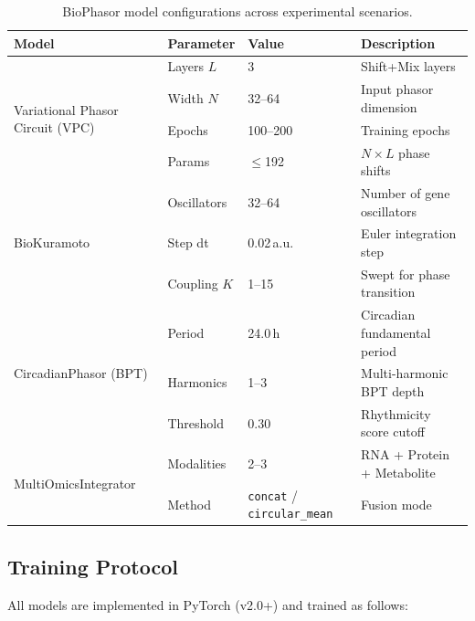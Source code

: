 \documentclass[preprint,12pt,amsmath,amssymb,superscriptaddress,floatfix]{revtex4-2}
\begin{document}
\begin{table}[h]
\centering
\caption{BioPhasor model configurations across experimental scenarios.}
\label{tab:hyperparams}
\begin{tabular}{llll}
\toprule
\textbf{Model} & \textbf{Parameter} & \textbf{Value} & \textbf{Description}\\
\midrule
\multirow{4}{*}{Variational Phasor Circuit (VPC)}
  & Layers $L$  & 3         & Shift+Mix layers \\
  & Width $N$   & 32--64    & Input phasor dimension \\
  & Epochs      & 100--200  & Training epochs \\
  & Params      & $\leq$192 & $N \times L$ phase shifts \\
\midrule
\multirow{3}{*}{BioKuramoto}
  & Oscillators & 32--64    & Number of gene oscillators \\
  & Step dt     & 0.02\,a.u.& Euler integration step \\
  & Coupling $K$& 1--15     & Swept for phase transition \\
\midrule
\multirow{3}{*}{CircadianPhasor (BPT)}
  & Period      & 24.0\,h   & Circadian fundamental period \\
  & Harmonics   & 1--3      & Multi-harmonic BPT depth \\
  & Threshold   & 0.30      & Rhythmicity score cutoff \\
\midrule
\multirow{2}{*}{MultiOmicsIntegrator}
  & Modalities  & 2--3      & RNA + Protein + Metabolite \\
  & Method      & \texttt{concat} / \texttt{circular\_mean} & Fusion mode \\
\bottomrule
\end{tabular}
\end{table}

\subsection{Training Protocol}
\label{subsec:training}

All models are implemented in PyTorch (v2.0+) and trained as follows:
\end{document}
